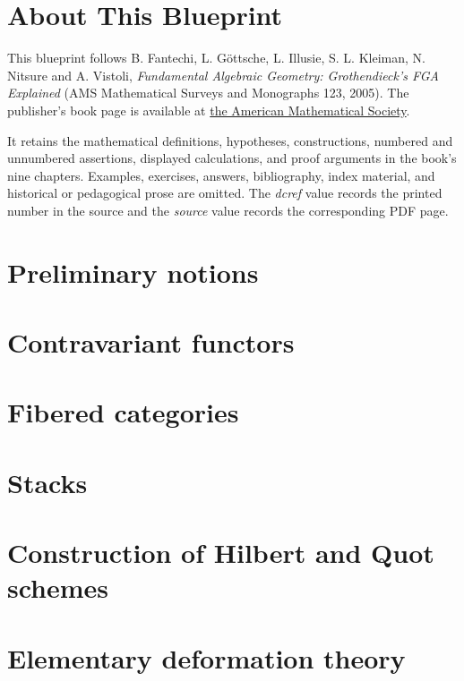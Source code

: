 

\chapter*{About This Blueprint}

This blueprint follows B. Fantechi, L. Göttsche, L. Illusie, S. L. Kleiman,
N. Nitsure and A. Vistoli, \emph{Fundamental Algebraic Geometry: Grothendieck's
FGA Explained} (AMS Mathematical Surveys and Monographs 123, 2005).  The
publisher's book page is available at
\href{https://bookstore.ams.org/SURV/123}{the American Mathematical Society}.

It retains the mathematical definitions, hypotheses, constructions, numbered
and unnumbered assertions, displayed calculations, and proof arguments in the
book's nine chapters.  Examples, exercises, answers, bibliography, index
material, and historical or pedagogical prose are omitted.  The \emph{dcref}
value records the printed number in the source and the \emph{source} value
records the corresponding PDF page.

\chapter{Preliminary notions}\label{chap:fga-preliminary}


\chapter{Contravariant functors}\label{chap:fga-functors}


\chapter{Fibered categories}\label{chap:fga-fibered}


\chapter{Stacks}\label{chap:fga-stacks}


\chapter{Construction of Hilbert and Quot schemes}\label{chap:fga-hilbert-quot}


\chapter{Elementary deformation theory}\label{chap:fga-deformation}


